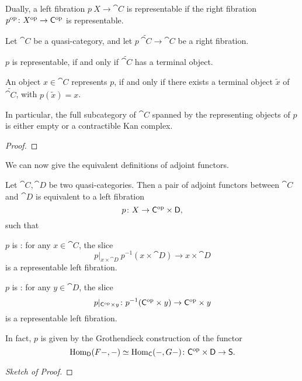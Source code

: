 Dually, a left fibration $p\:X\to\cat C$ is representable 
if the right fibration $p^{\mathrm{op}}\colon X^{\mathrm{op}}\to\mathsf{C}^{\mathrm{op}}$ is representable.

\begin{proposition}
    Let $\cat C$ be a quasi-category,
    and let $p\:\tilde{\cat C}\to\cat C$ be a right fibration.
    \begin{itms}
        \item $p$ is representable, if and only if $\tilde{\cat C}$
        has a terminal object.
        \item An object $x\in\cat C$ represents $p$,
        if and only if there exists a terminal object $\tilde x$ of $\tilde{\cat C}$,
        with $p(\tilde x)=x$.
    \end{itms}
    In particular, the full subcategory of $\cat C$
    spanned by the representing objects of $p$
    is either empty or a contractible Kan complex.
\end{proposition}

\begin{proof}
    \nyw
\end{proof}

We can now give the equivalent definitions
of adjoint functors.

\begin{proposition}
    Let $\cat C,\cat D$ be two quasi-categories.
    Then a pair of adjoint functors between $\cat C$ and $\cat D$
    is equivalent to a left fibration 
    \[ p\colon X\to\mathsf{C}^{\mathrm{op}}\times\mathsf{D}, \]
    such that 
    \begin{itms}
        \item $p$ is :
        for any $x\in\cat C$, the slice 
        \[ p|_{x\times\cat D}\:p^{-1}(x\times\cat D)\to x\times\cat D \]
        is a representable left fibration.
        \item $p$ is :
        for any $y\in\cat D$, the slice 
        \[ p|_{\mathsf{C}^{\mathrm{op}}\times y}\colon p^{-1}(\mathsf{C}^{\mathrm{op}}\times y)\to \mathsf{C}^{\mathrm{op}}\times y \]
        is a representable left fibration.
    \end{itms}
    In fact, $p$ is given by the Grothendieck construction 
    of the functor
    \[ \operatorname{Hom}_{\mathsf{D}}(F-,-)\simeq\operatorname{Hom}_{\mathsf{C}}(-,G-)\colon\mathsf{C}^{\mathrm{op}}\times\mathsf{D}\to\mathsf{S}. \]
\end{proposition}

\begin{proof}[Sketch of Proof]
    \nyw
\end{proof}

